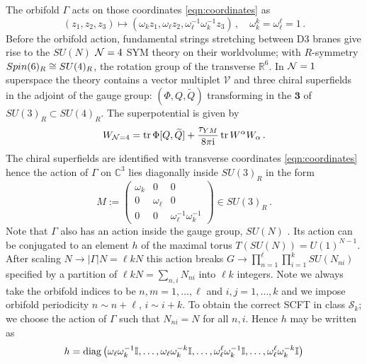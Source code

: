 \documentclass[main.tex]{subfiles}
\begin{document}
The orbifold $\Gamma$ acts on those coordinates \eqref{eqn:coordinates} as
\begin{equation}\label{eqn:orbifoldactionR10}
(z_1,z_2,z_3)\mapsto(\omega_kz_1,\omega_{\ell}z_2,\omega_{\ell}^{-1}\omega^{-1}_{k}z_3)\,,\quad \omega_k^k=\omega_{\ell}^{\ell}=1\,.
\end{equation}
Before the orbifold action, fundamental strings stretching between D$3$ branes give rise to the $SU(N)$ $\mathcal{N}=4$ SYM theory on their worldvolume; with $R$-symmetry $Spin(6)_R\cong SU(4)_R$, the rotation group of the transverse $\mathbb{R}^6$.  In $\mathcal{N}=1$ superspace the theory contains a vector multiplet $\mathcal{V}$ and three chiral superfields in the adjoint of the gauge group: $\left(\Phi,Q,\widetilde{Q}\right)$ transforming in the $\mathbf{3}$ of $SU(3)_R\subset SU(4)_R$.  The superpotential is given by
\begin{equation}
W_{\mathcal{N}=4}=\operatorname{tr}\Phi[Q,\widetilde{Q}]+\frac{\tau_{YM}}{8\pi\mathrm{i}}\operatorname{tr} W^{\alpha}W_{\alpha}\,.
\end{equation}
The chiral superfields are identified with transverse coordinates \eqref{eqn:coordinates} hence the action of $\Gamma$ on $\mathbb{C}^3$ lies diagonally inside $SU(3)_{R}$ in the form
\begin{equation}
M:=\begin{pmatrix}
\omega_k&0&0\\
0&\omega_{\ell}&0\\
0&0&\omega_{\ell}^{-1}\omega_{k}^{-1}
\end{pmatrix}\in SU(3)_{R}\,.
\end{equation}
Note that $\Gamma$ also has an action inside the gauge group, $SU(N)$ \cite{Douglas:1996sw}.  Its action can be conjugated to an element $h$ of the maximal torus $T(SU(N))=U(1)^{N-1}$.  After scaling $N\to|\Gamma|N=\ell kN$ this action breaks $G\to \prod_{n=1}^{\ell}\prod_{i=1}^kSU(N_{ni})$ specified by a partition of $\ell kN=\sum_{n,i}N_{ni}$ into $\ell k$ integers.  Note we always take the orbifold indices to be $n,m=1,\dots,\ell$ and $i,j=1,\dots,k$ and we impose orbifold periodicity $n\sim n+\ell$, $i\sim i+k$.  To obtain the correct SCFT in class $\mathcal{S}_k$; we choose the action of $\Gamma$ such that $N_{ni}=N$ for all $n,i$.  Hence $h$ may be written as
\begin{equation}\label{eqn:orbifoldactionSUN}
h=\operatorname{diag}\left(\omega_{\ell}\omega^{-1}_k\mathbb{I},\dots,\omega_{\ell}\omega_k^{-k}\mathbb{I},\dots,\omega^{\ell}_{\ell}\omega_k^{-1}\mathbb{I},\dots, \omega_{\ell}^{\ell}\omega^{-k}_k\mathbb{I}\right)
\end{equation}
\end{document}
